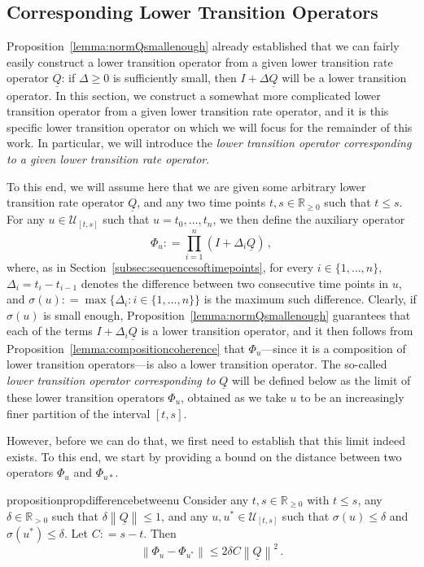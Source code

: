 \documentclass[10pt,a4paper]{paper}
\theoremstyle{definition}
\newcommand{\reals}{\mathbb{R}}
\newcommand{\realspos}{\reals_{>0}}
\newcommand{\realsnonneg}{\reals_{\geq 0}}
\newcommand{\lrate}{\underline{Q}}
\newcommand{\norm}[1]{\left\lVert #1 \right\rVert}
\newcommand{\coloneqq}{:\!=}
\begin{document}
\subsection{Corresponding Lower Transition Operators}

Proposition~\ref{lemma:normQsmallenough} already established that we can fairly easily construct a lower transition operator from a given lower transition rate operator $\lrate$: if $\Delta\geq0$ is sufficiently small, then $I+\Delta\lrate$ will be a lower transition operator. In this section, we construct a somewhat more complicated lower transition operator from a given lower transition rate operator, and it is this specific lower transition operator on which we will focus for the remainder of this work. In particular, we will introduce the \emph{lower transition operator corresponding to a given lower transition rate operator}.

To this end, we will assume here that we are given some arbitrary lower transition rate operator $\lrate$, and any two time points $t,s\in\realsnonneg$ such that $t\leq s$. For any $u\in\mathcal{U}_{[t,s]}$ such that $u=t_0,\ldots,t_n$, we then define the auxiliary operator
\begin{equation}\label{eq:aux_lower_trans}
\Phi_u\coloneqq\prod_{i=1}^n(I+\Delta_i\lrate)\,,
\end{equation}
where, as in Section~\ref{subsec:sequencesoftimepoints}, for every $i\in\{1,\ldots,n\}$, $\Delta_i= t_i-t_{i-1}$ denotes the difference between two consecutive time points in $u$, and $\sigma(u)\coloneqq \max\{\Delta_i:i\in\{1,\ldots,n\}\}$ is the maximum such difference. Clearly, if $\sigma(u)$ is small enough, Proposition~\ref{lemma:normQsmallenough} guarantees that each of the terms $I+\Delta_i\lrate$ is a lower transition operator, and it then follows from Proposition~\ref{lemma:compositioncoherence} that $\Phi_u$---since it is a composition of lower transition operators---is also a lower transition operator. The so-called \emph{lower transition operator corresponding to} $\lrate$ will be defined below as the limit of these lower transition operators $\Phi_u$, obtained as we take $u$ to be an increasingly finer partition of the interval $[t,s]$.

However, before we can do that, we first need to establish that this limit indeed exists. To this end, we start by providing a bound on the distance between two operators $\Phi_u$ and $\Phi_{u*}$.

\begin{restatable}{proposition}{propdifferencebetweenu}
\label{prop:differencebetweenu}
Consider any $t,s\in\realsnonneg$ with $t\leq s$, any $\delta\in\realspos$ such that $\delta\norm{\lrate}\leq1$, and any $u,u^*\in\mathcal{U}_{[t,s]}$ such that $\sigma(u)\leq\delta$ and $\sigma(u^*)\leq\delta$. Let $C\coloneqq s-t$. Then
\begin{equation*}
\norm{\Phi_u-\Phi_{u^*}}\leq 2\delta C\norm{\lrate}^2\,.
\end{equation*}\\[-27pt]
\end{restatable}
\end{document}
